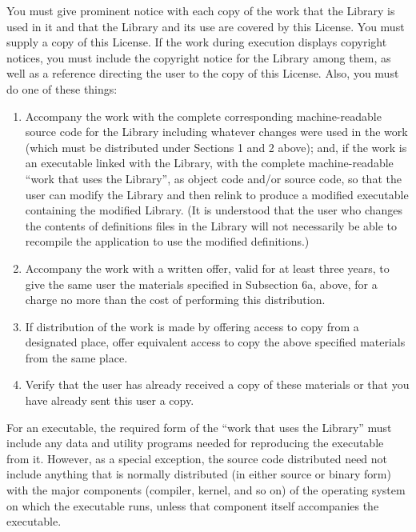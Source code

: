\begin{enumerate}
  You must give prominent notice with each copy of the work that the
Library is used in it and that the Library and its use are covered by
this License.  You must supply a copy of this License.  If the work
during execution displays copyright notices, you must include the
copyright notice for the Library among them, as well as a reference
directing the user to the copy of this License.  Also, you must do one
of these things:

\begin{enumerate}
\item[a.]  Accompany the work with the complete corresponding
  machine-readable source code for the Library including whatever
  changes were used in the work (which must be distributed under
  Sections 1 and 2 above); and, if the work is an executable linked
  with the Library, with the complete machine-readable ``work that uses
  the Library'', as object code and/or source code, so that the user
  can modify the Library and then relink to produce a modified
  executable containing the modified Library.  (It is understood that
  the user who changes the contents of definitions files in the
  Library will not necessarily be able to recompile the application to
  use the modified definitions.)

\item[b.] Accompany the work with a written offer, valid for at
    least three years, to give the same user the materials
    specified in Subsection 6a, above, for a charge no more
    than the cost of performing this distribution.

\item[c.] If distribution of the work is made by offering access to copy
    from a designated place, offer equivalent access to copy the above
    specified materials from the same place.

\item[d.] Verify that the user has already received a copy of these
    materials or that you have already sent this user a copy.
\end{enumerate}

  For an executable, the required form of the ``work that uses the
Library'' must include any data and utility programs needed for
reproducing the executable from it.  However, as a special exception,
the source code distributed need not include anything that is normally
distributed (in either source or binary form) with the major
components (compiler, kernel, and so on) of the operating system on
which the executable runs, unless that component itself accompanies
the executable.


\end{enumerate}
